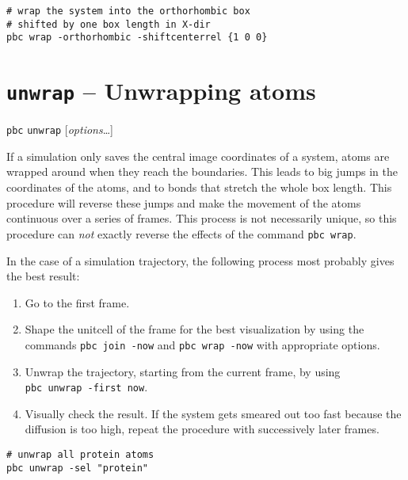 \documentclass[a4paper, DIV12]{scrartcl}
\begin{document}

\begin{Verbatim}
# wrap the system into the orthorhombic box
# shifted by one box length in X-dir
pbc wrap -orthorhombic -shiftcenterrel {1 0 0}
\end{Verbatim}

\section{\texttt{unwrap} -- Unwrapping atoms}
\label{sec:unwrap}

\texttt{pbc} \texttt{unwrap} [\textit{options}\dots]


If a simulation only saves the central image coordinates of a system,
atoms are wrapped around when they reach the boundaries.  This leads
to big jumps in the coordinates of the atoms, and to bonds that
stretch the whole box length. This procedure will reverse these jumps
and make the movement of the atoms continuous over a series of
frames. This process is not necessarily unique, so this procedure can
\emph{not} exactly reverse the effects of the command \texttt{pbc
  wrap}.

In the case of a simulation trajectory, the following process most
probably gives the best result:
\begin{enumerate}
\item Go to the first frame.
\item \label{shape} Shape the unitcell of the frame for the best
  visualization by using the commands \mbox{\texttt{pbc join -now}}
  and \mbox{\texttt{pbc wrap -now}} with appropriate options.
\item Unwrap the trajectory, starting from the current frame, by using\\
  \mbox{\texttt{pbc unwrap -first now}}.
\item Visually check the result. If the system gets smeared out too
  fast because the diffusion is too high, repeat the procedure with
  successively later frames.
\end{enumerate}


\begin{Verbatim}
# unwrap all protein atoms
pbc unwrap -sel "protein"
\end{Verbatim}

\end{document}
